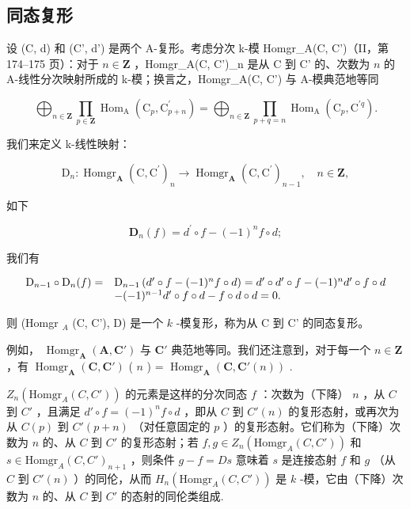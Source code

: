 \subsection{同态复形}

设 (C, d) 和 (C', d') 是两个 A-复形。考虑分次 k-模 Homgr\_A(C, C')（II，第 174–175 页）：对于 \(n \in \mathbf{Z}\) ，Homgr\_A(C, C')\_n 是从 C 到 C' 的、次数为 \(n\) 的 A-线性分次映射所成的 k-模；换言之，Homgr\_A(C, C') 与 A-模典范地等同

\[
\bigoplus_ {n \in \mathbf {Z}} \prod_ {p \in \mathbf {Z}} \operatorname{Hom} _ {\mathrm{A}} \left(\mathrm{C} _ {p}, \mathrm{C} _ {p + n} ^ {\prime}\right) = \bigoplus_ {n \in \mathbf {Z}} \prod_ {p + q = n} \operatorname{Hom} _ {\mathrm{A}} \left(\mathrm{C} _ {p}, \mathrm{C} ^ {\prime q}\right).
\]

我们来定义 k-线性映射：

\[
\mathrm{D} _ {n}: \operatorname{Homgr} _ {\mathbf {A}} (\mathrm{C}, \mathrm{C} ^ {\prime}) _ {n} \rightarrow \operatorname{Homgr} _ {\mathbf {A}} (\mathrm{C}, \mathrm{C} ^ {\prime}) _ {n - 1}, \quad n \in \mathbf {Z},
\]

如下

\[
\mathbf {D} _ {n} (f) = d ^ {\prime} \circ f - (- 1) ^ {n} f \circ d;\tag{1}
\]

我们有

\[
\begin{array}{r l} \mathrm{D} _ {n - 1} \circ \mathrm{D} _ {n} (f) = & \mathrm{D} _ {n - 1} \left(d ^ {\prime} \circ f - (- 1) ^ {n} f \circ d\right) = d ^ {\prime} \circ d ^ {\prime} \circ f - (- 1) ^ {n} d ^ {\prime} \circ f \circ d \\ & - (- 1) ^ {n - 1} d ^ {\prime} \circ f \circ d - f \circ d \circ d = 0. \end{array}
\]

则 (Homgr \(_{A}\) (C, C'), D) 是一个 \(k\) -模复形，称为从 C 到 C' 的同态复形。

例如， \(\operatorname{Homgr}_{\mathbf{A}}(\mathbf{A}, \mathbf{C}')\) 与 \(\mathbf{C}'\) 典范地等同。我们还注意到，对于每一个 \(n \in \mathbf{Z}\) ，有 \(\operatorname{Homgr}_{\mathbf{A}}(\mathbf{C}, \mathbf{C}')\) ( \(n\) ) = \(\operatorname{Homgr}_{\mathbf{A}}(\mathbf{C}, \mathbf{C}'(n))\) .

\(Z_n(\text{Homgr}_A(C, C'))\) 的元素是这样的分次同态 \(f\) ：次数为（下降） \(n\) ，从 \(C\) 到 \(C'\) ，且满足 \(d' \circ f = (-1)^n f \circ d\) ，即从 \(C\) 到 \(C'(n)\) 的复形态射，或再次为从 \(C(p)\) 到 \(C'(p + n)\) （对任意固定的 \(p\) ）的复形态射。它们称为（下降）次数为 \(n\) 的、从 \(C\) 到 \(C'\) 的复形态射；若 \(f, g \in Z_n(\text{Homgr}_A(C, C'))\) 和 \(s \in \text{Homgr}_A(C, C')_{n+1}\) ，则条件 \(g - f = Ds\) 意味着 \(s\) 是连接态射 \(f\) 和 \(g\) （从 \(C\) 到 \(C'(n)\) ）的同伦，从而 \(H_n(\text{Homgr}_A(C, C'))\) 是 \(k\) -模，它由（下降）次数为 \(n\) 的、从 \(C\) 到 \(C'\) 的态射的同伦类组成.

